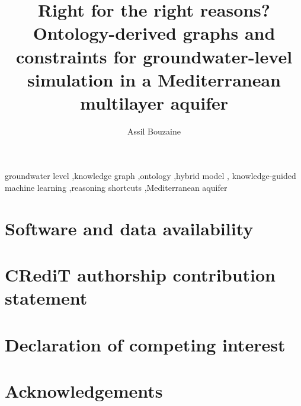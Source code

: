 \documentclass[review,authoryear]{elsarticle}
\newif\ifpaperbibliography
\begin{document}
\begin{frontmatter}

\title{Right for the right reasons? Ontology-derived graphs and constraints for
groundwater-level simulation in a Mediterranean multilayer aquifer}

\author[isamm]{Assil Bouzaine}

\begin{abstract}
\end{abstract}

\begin{keyword}
groundwater level \sep knowledge graph \sep ontology \sep hybrid model \sep
knowledge-guided machine learning \sep reasoning shortcuts \sep Mediterranean aquifer
\end{keyword}

\end{frontmatter}










\section*{Software and data availability}

\section*{CRediT authorship contribution statement}

\section*{Declaration of competing interest}

\section*{Acknowledgements}

\ifpaperbibliography
  
  
\fi
\end{document}
